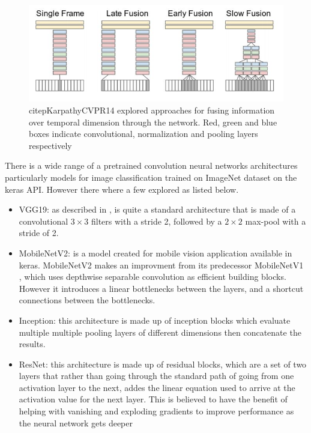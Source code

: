 \begin{figure}
    \includegraphics[width=\linewidth]{K_models.JPG}
    \caption{citep{KarpathyCVPR14} explored approaches for fusing information over
    temporal dimension through the network. Red, green and
    blue boxes indicate convolutional, normalization and pooling layers respectively \citep{KarpathyCVPR14}}
    \label{fig:k_models}
\end{figure}
There is a wide range of a pretrained convolution neural networks architectures particularly models for image classification trained on ImageNet dataset on the keras API. However there where a few explored as listed below.
\begin{itemize}
    \item VGG19: as described in \citep{simonyan2014deep}, is quite a standard architecture that is made of a convolutional $3 \times3$ filters with a stride 2, followed by a $2\times2$ max-pool with a stride of 2.
    \item MobileNetV2: is a model created for mobile vision application available in keras. MobileNetV2\cite{Sandler_2018} makes an improvment from its predecessor MobileNetV1 \citep{howard2017mobilenets}, which uses depthwise separable convolution as efficient building blocks. However it introduces a linear bottlenecks between the layers, and a shortcut connections between the bottlenecks.
    \item Inception: this architecture \citep{Szegedy_2016} is made up of inception blocks which evaluate multiple multiple pooling layers of different dimensions then concatenate the results.
    \item ResNet: this architecture \citep{He_2016} is made up of residual blocks, which are a set of two layers that rather than going through the standard path of going from one activation layer to the next, addes the linear equation used to arrive at the activation value for the next layer. This is believed to have the benefit of helping with vanishing and exploding gradients to improve performance as the neural network gets deeper
\end{itemize}
